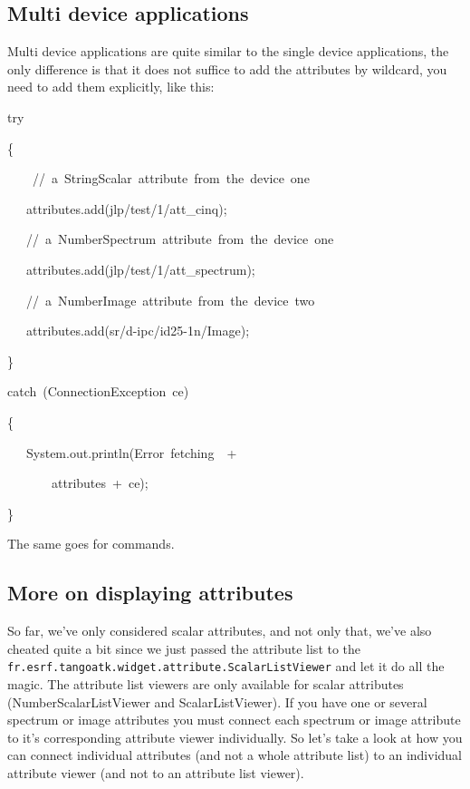\subsection{Multi device applications}

Multi device applications are quite similar to the single device applications,
the only difference is that it does not suffice to add the attributes
by wildcard, you need to add them explicitly, like this: \\



\begin{lyxcode}
try

\{~

~~~~//~a~StringScalar~attribute~from~the~device~one

~~~attributes.add(\textquotedbl{}jlp/test/1/att\_cinq\textquotedbl{});

~~~//~a~NumberSpectrum~attribute~from~the~device~one

~~~attributes.add(\textquotedbl{}jlp/test/1/att\_spectrum\textquotedbl{});

~~~//~a~NumberImage~attribute~from~the~device~two

~~~attributes.add(\textquotedbl{}sr/d-ipc/id25-1n/Image\textquotedbl{});

\}

catch~(ConnectionException~ce)

\{

~~~System.out.println(\textquotedbl{}Error~fetching~\textquotedbl{}~+~

~~~~~~~\textquotedbl{}attributes\textquotedbl{}~+~ce);

\}


\end{lyxcode}


The same goes for commands.


\subsection{More on displaying attributes}

So far, we've only considered scalar attributes, and
not only that, we've also cheated quite a bit since we just passed
the attribute list to the \texttt{fr.esrf.tangoatk.widget.attribute.ScalarListViewer}
and let it do all the magic. The attribute list viewers are only available
for scalar attributes (NumberScalarListViewer
and ScalarListViewer). If you have one or
several spectrum or image attributes
you must connect each spectrum or image attribute to it's corresponding
attribute viewer individually. So let's take a look at how you can
connect individual attributes (and not a whole attribute list) to
an individual attribute viewer (and not to an attribute list viewer).



